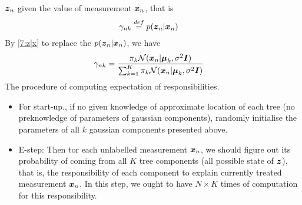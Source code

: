 \documentclass[11pt,a4paper]{article}
\newcommand{\htab}{\hspace*{0.63cm}}
\newcommand{\bs}[1]{\boldsymbol{#1}}
\begin{document}
$\zn$ given the value of measurement $\xn$, that is 
    \begin{align}
        \gamma_{nk} &\overset{def}{=} p (\zn | \xn) 
        \end{align}
\htab By \eqref{7:z|x} to replace the $p(\zn | \xn)$, we have
\begin{align}
    \gamma_{nk} &= \frac{\pk \Nk }{\sumk \pk \Nk} \label{6:gammadef}
    \end{align}
\htab The procedure of computing expectation of responsibilities. 
\begin{itemize}
    \item{For start-up., if no given knowledge of approximate location of each tree (no preknowledge of parameters of gaussian components), randomly initialise the parameters of all $k$ gaussian components presented above.}
    \item{E-step: Then tor each unlabelled measurement $\xn$, we should figure out its probability of coming from all $K$ tree components (all possible state of $\z$), that is, the responsibility of each component to explain currently treated measurement $\xn$.  In this step, we ought to have $N \times K$ times of computation for this responsibility.}
\end{itemize}
\newpage
\newcommand{\quadratic}{-\frac{(\difxm)^{T} (\difxm)}{2\sigma^{2} }}
\newcommand{\diffquadratic}{\frac{ (\difxm)}{\sigma^{2}} }
\newcommand{\lag}{\mathcal{L}'(\bs{\pi},\lambda)}
\end{document}

